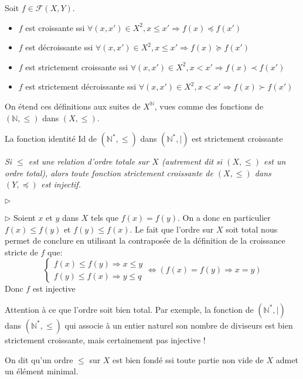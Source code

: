 \documentclass{scrartcl}
\begin{document}
			Soit $f \in \mathcal{F}(X,Y)$. 
			\begin{itemize}
				\item $f$ est croissante ssi $\forall (x,x') \in X^2, x \leq x' \Rightarrow f(x) \preceq f(x')$
				\item $f$ est décroissante ssi $\forall (x,x') \in X^2, x \leq x' \Rightarrow f(x) \succeq f(x')$
				\item $f$ est strictement croissante ssi $\forall (x,x') \in X^2, x < x' \Rightarrow f(x) \prec f(x')$
				\item $f$ est strictement décroissante ssi $\forall (x,x') \in X^2, x < x' \Rightarrow f(x) \succ f(x')$
			\end{itemize}

			\rem On étend ces définitions aux suites de $X^\mathbb{N}$, 
			vues comme des fonctions de $(\mathbb{N},\leq)$ dans $(X,\leq)$.

			\exemple La fonction identité Id de $(\mathbb{N}^*,\leq)$ dans $(\mathbb{N}^*,|)$ est strictement croissante
			
			\prop \textsl{Si $\leq$ est une relation d'ordre totale sur $X$ (autrement dit si $(X,\leq)$ est un ordre total),
				alors toute fonction strictement croissante de $(X,\leq)$ dans $(Y,\preceq)$ est injectif.}
			\begin{labeling}{$\triangleright$}
				\item [$\triangleright$] Soient $x$ et $y$ dans $X$ tels que $f(x) = f(y)$.
				On a donc en particulier $f(x) \leq f(y)$ et $f(y) \leq f(x)$. 
				Le fait que l'ordre sur $X$ soit total nous permet de conclure
				en utilisant la contraposée de la définition de la croissance stricte de $f$ que:
				\[
					\begin{cases}
						f(x) \leq f(y) \Rightarrow x \leq y \\
						f(y) \leq f(x) \Rightarrow y \leq q
					\end{cases}
					\Leftrightarrow \left(f(x) = f(y) \Rightarrow x=y \right)
				\]
				Donc $f$ est injective
			\end{labeling}

			\rem Attention à ce que l'ordre soit bien total. 
				Par exemple, la fonction de $(\mathbb{N}^*,|)$ dans $(\mathbb{N}^*,\leq)$ 
				qui associe à un entier naturel son nombre de diviseurs est bien strictement croissante,
				mais certainement pas injective !

			On dit qu'un ordre $\leq$ sur $X$ est bien fondé ssi toute partie non vide de $X$ admet
			un élément minimal.
\end{document}

